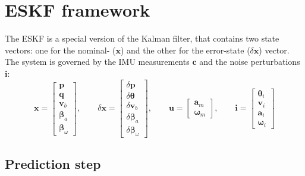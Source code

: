 \section{ESKF framework}

The ESKF is a special version of the Kalman filter, that contains two state vectors: one for the nominal- ($\mathbf{x}$) and the other for the error-state ($\delta\mathbf{x}$) vector. The system is governed by the IMU measurements $\mathbf{c}$ and the noise perturbations $\mathbf{i}$:
\begin{equation}
    \mathbf{x}=\begin{bmatrix}
    \mathbf{p} \\
    \mathbf{q} \\
    \mathbf{v}_{b} \\
    \boldsymbol{\beta}_{a} \\
    \boldsymbol{\beta}_{\omega}
    \end{bmatrix}, \qquad
    \delta\mathbf{x}=\begin{bmatrix}
    \delta\mathbf{p} \\
    \delta\boldsymbol{\theta} \\
    \delta\mathbf{v}_{b} \\
    \delta\boldsymbol{\beta}_{a} \\
    \delta\boldsymbol{\beta}_{\omega}
    \end{bmatrix}, \qquad
    \mathbf{u}=\begin{bmatrix}
        \mathbf{a}_{m} \\
        \boldsymbol{\omega}_{m}
    \end{bmatrix}, \qquad
    \mathbf{i}=\begin{bmatrix}
        \boldsymbol{\theta}_i \\
        \mathbf{v}_i \\
        \mathbf{a}_i \\
        \boldsymbol{\omega}_i
    \end{bmatrix}
\end{equation}

\subsection{Prediction step}

